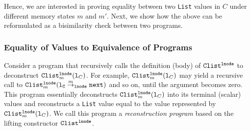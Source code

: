Hence, we are interested in proving equality
between two {\tt List} values in $C$ under different memory states $m$ and $m'$.
Next, we show how the above can be reformulated as a bisimilarity check between
two programs.



\subsubsection{Equality of Values to Equivalence of Programs}
\label{sec:recursiveEqToBisim}
Consider a program that recursively calls the definition (body) of
${\tt Clist}^{\tt lnode}$ to deconstruct
${\tt Clist}_m^{{\tt lnode}}({\tt l}_C)$.
For example,
${\tt Clist}_m^{{\tt lnode}}({\tt l}_C)$
may yield a recursive call
to ${\tt Clist}_m^{{\tt lnode}}({\tt {\tt l}_C} \overset{m}{\rightarrow}_{\tt lnode} {\tt next})$
and so on, until the argument becomes zero.
This program essentially deconstructs ${\tt Clist}_m^{{\tt lnode}}({\tt l}_C)$
into its terminal (scalar) values and reconstructs
a {\tt List} value equal to the value
represented by ${\tt Clist}_m^{{\tt lnode}}({\tt l}_C)$.
We call this program a {\em reconstruction program} based
on the lifting constructor
${\tt Clist}^{{\tt lnode}}$.

